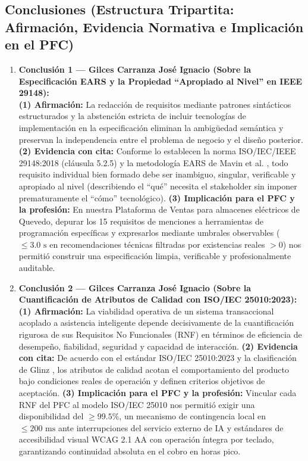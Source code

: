 \documentclass[conference,10pt]{IEEEtran}
\begin{document}
	\subsection{Conclusiones (Estructura Tripartita: Afirmación, Evidencia Normativa e Implicación en el PFC)}
	\begin{enumerate}
		\item \textbf{Conclusión 1 --- Gilces Carranza José Ignacio (Sobre la Especificación EARS y la Propiedad ``Apropiado al Nivel'' en IEEE 29148):} \\
		\textbf{(1) Afirmación:} La redacción de requisitos mediante patrones sintácticos estructurados y la abstención estricta de incluir tecnologías de implementación en la especificación eliminan la ambigüedad semántica y preservan la independencia entre el problema de negocio y el diseño posterior. \textbf{(2) Evidencia con cita:} Conforme lo establecen la norma ISO/IEC/IEEE 29148:2018 (cláusula 5.2.5) \cite{ieee29148} y la metodología EARS de Mavin et al. \cite{mavin2009ears}, todo requisito individual bien formado debe ser inambiguo, singular, verificable y apropiado al nivel (describiendo el ``qué'' necesita el stakeholder sin imponer prematuramente el ``cómo'' tecnológico). \textbf{(3) Implicación para el PFC y la profesión:} En nuestra Plataforma de Ventas para almacenes eléctricos de Quevedo, depurar los 15 requisitos de menciones a herramientas de programación específicas y expresarlos mediante umbrales observables ($\le 3.0\text{ s}$ en recomendaciones técnicas filtradas por existencias reales $>0$) nos permitió construir una especificación limpia, verificable y profesionalmente auditable.
		
		\item \textbf{Conclusión 2 --- Gilces Carranza José Ignacio (Sobre la Cuantificación de Atributos de Calidad con ISO/IEC 25010:2023):} \\
		\textbf{(1) Afirmación:} La viabilidad operativa de un sistema transaccional acoplado a asistencia inteligente depende decisivamente de la cuantificación rigurosa de sus Requisitos No Funcionales (RNF) en términos de eficiencia de desempeño, fiabilidad, seguridad y capacidad de interacción. \textbf{(2) Evidencia con cita:} De acuerdo con el estándar ISO/IEC 25010:2023 \cite{iso25010} y la clasificación de Glinz \cite{glinz2007nfr}, los atributos de calidad acotan el comportamiento del producto bajo condiciones reales de operación y definen criterios objetivos de aceptación. \textbf{(3) Implicación para el PFC y la profesión:} Vincular cada RNF del PFC al modelo ISO/IEC 25010 nos permitió exigir una disponibilidad del $\ge 99.5\%$, un mecanismo de contingencia local en $\le 200\text{ ms}$ ante interrupciones del servicio externo de IA y estándares de accesibilidad visual WCAG 2.1 AA con operación íntegra por teclado, garantizando continuidad absoluta en el cobro en horas pico.
		

\end{enumerate}
\end{document}
